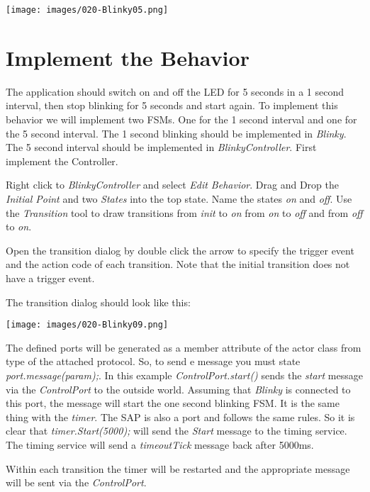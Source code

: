 \texttt{[image: images/020-Blinky05.png]}

\section{Implement the Behavior}

The application should switch on and off the LED for 5 seconds in a 1 second interval, then stop blinking for 5 seconds and start again. To implement this behavior we will implement two FSMs. One for the 1 second interval and one for the 5 second interval. The 1 second blinking should be implemented in \textit{Blinky}. The 5 second interval should be implemented in \textit{BlinkyController}. First implement the Controller.

Right click to \textit{BlinkyController} and select \textit{Edit Behavior}.
Drag and Drop the \textit{Initial Point} and two \textit{States} into the top state. Name the states \textit{on} and \textit{off}. 
Use the \textit{Transition} tool to draw transitions from \textit{init} to \textit{on} from \textit{on} to \textit{off} and from \textit{off} to \textit{on}.

Open the transition dialog by double click the arrow to specify the trigger event and the action code of each transition. Note that the initial transition does not have a trigger event.

The transition dialog should look like this:

\texttt{[image: images/020-Blinky09.png]}

The defined ports will be generated as a member attribute of the actor class from type of the attached protocol. So, to send e message you must state \textit{port.message(param);}. In this example \textit{ControlPort.start()} sends the \textit{start} message via the \textit{ControlPort} to the outside world. Assuming that \textit{Blinky} is connected to this port, the message will start the one second blinking FSM. It is the same thing with the \textit{timer}. The SAP is also a port and follows the same rules. So it is clear that \textit{timer.Start(5000);} will send the \textit{Start} message to the timing service. The timing service will send a \textit{timeoutTick} message back after 5000ms.

Within each transition the timer will be restarted and the appropriate message will be sent via the \textit{ControlPort}. 

